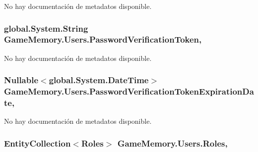 No hay documentación de metadatos disponible. 

\hypertarget{class_game_memory_1_1_users_a70980afbd2f715e7238fc3e8ffcb4741}{
\subsubsection[{Password\-Verification\-Token}]{\setlength{\rightskip}{0pt plus 5cm}global.\-System.\-String Game\-Memory.\-Users.\-Password\-Verification\-Token\hspace{0.3cm}{\ttfamily [get]}, {\ttfamily [set]}}}\label{class_game_memory_1_1_users_a70980afbd2f715e7238fc3e8ffcb4741}


No hay documentación de metadatos disponible. 

\hypertarget{class_game_memory_1_1_users_af5736cddf03b326304374ae1352404d1}{
\subsubsection[{Password\-Verification\-Token\-Expiration\-Date}]{\setlength{\rightskip}{0pt plus 5cm}Nullable$<$global.\-System.\-Date\-Time$>$ Game\-Memory.\-Users.\-Password\-Verification\-Token\-Expiration\-Date\hspace{0.3cm}{\ttfamily [get]}, {\ttfamily [set]}}}\label{class_game_memory_1_1_users_af5736cddf03b326304374ae1352404d1}


No hay documentación de metadatos disponible. 

\hypertarget{class_game_memory_1_1_users_a1dea6fa0cc9c30a97d4090a9523a1d72}{
\subsubsection[{Roles}]{\setlength{\rightskip}{0pt plus 5cm}Entity\-Collection$<${\bf Roles}$>$ Game\-Memory.\-Users.\-Roles\hspace{0.3cm}{\ttfamily [get]}, {\ttfamily [set]}}}\label{class_game_memory_1_1_users_a1dea6fa0cc9c30a97d4090a9523a1d72}


